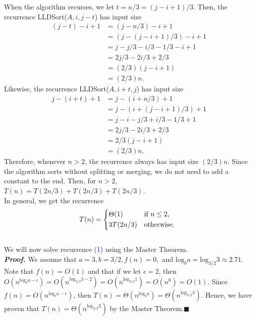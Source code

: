 \documentclass{article}
\begin{document}
When the algorithm recurses, we let $t = n/3 = (j - i + 1)/3$. Then, the recurrence LLDSort($A, i, j-t$) has input size
\begin{align*}
(j - t) - i + 1 &= (j - n/3) - i + 1 \\
&= (j - (j - i + 1)/3) - i + 1\\
&= j - j/3 - i/3 - 1/3 - i + 1\\
&= 2j/3 - 2i/3 + 2/3\\
&= (2/3)(j - i + 1)\\
&= (2/3)n.
\end{align*}
Likewise, the recurrence LLDSort($A,i+t,j$) has input size
\begin{align*}
j - (i + t) + 1 &= j - (i + n/3) + 1\\
&= j - (i + (j - i + 1)/3) + 1\\
&= j - i - j/3 + i/3 -1/3 + 1\\
&= 2j/3 -2i/3 + 2/3\\
&= 2/3(j - i + 1)\\
&= (2/3)n.
\end{align*}
Therefore, whenever $n > 2$, the recurrence always has input size $(2/3)n$. Since the algorithm sorts without splitting or merging, we do not need to add a constant to the end. Then, for $n > 2$, $T(n) = T(2n/3) + T(2n/3) + T(2n/3)$.\\

In general, we get the recurrence
\begin{equation}
T(n) =
\begin{dcases*}
\Theta(1) & if $n \leq 2$,\\
3T(2n/3) & otherwise.
\end{dcases*}
\end{equation}
\\We will now solve recurrence (\textcolor{blue}{1}) using the Master Theorem.\\
\textit{\textbf{Proof.}} We assume that $a = 3, b = 3/2, f(n) = 0,$ and $\text{log}_b a = \text{log}_{3/2} 3 \approx 2.71$. Note that $f(n) = O(1)$ and that if we let $\epsilon = 2$, then $O(n^{\text{log}_b a - \epsilon}) = O(n^{\text{log}_{3/2} 3 - 2}) = O(n^{\text{log}_{3/2} 1}) = O(n^0) = O(1).$ Since $f(n) = O(n^{\text{log}_b a - \epsilon})$, then $T(n) = \Theta(n^{\text{log}_b a}) = \Theta(n^{\text{log}_{3/2} 3}).$ Hence, we have proven that $T(n) = \Theta(n^{\text{log}_{3/2} 3})$ by the Master Theorem.\hfill$\blacksquare$
\end{document}
